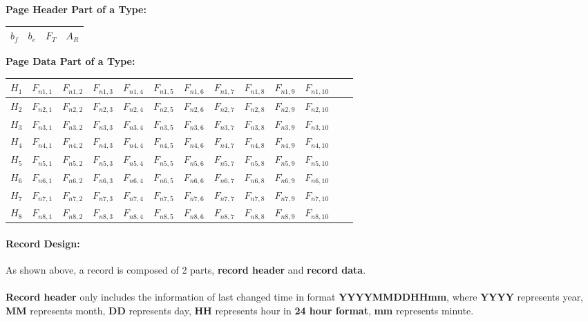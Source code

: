\documentclass[12pt]{report}
\begin{document}
\vspace{1cm}

\hspace{3.2cm}\textbf{Page Header Part of a Type:} 
{
\begin{center}
\begin{tabular}{|l|l|l|l|}
\hline
$b_f$ & $b_e$ & $F_{T}$ & $A_{R}$ \\
\hline
\end{tabular}
\end{center}
}

\vspace{2cm}

\hspace{3.4cm}\textbf{Page Data Part of a Type:} 
{
\begin{center}
\begin{tabular}{|l|l|l|l|l|l|l|l|l|l|l|l|l|}
\hline
 $H_{1}$ & $F_{n1,1}$ & $F_{n1,2}$ & $F_{n1,3}$ & $F_{n1,4}$ & $F_{n1,5}$ & $F_{n1,6}$ & $F_{n1,7}$ & $F_{n1,8}$ & $F_{n1,9}$ & $F_{n{1,10}}$ \\
\hline
 $H_{2}$ & $F_{n2,1}$ & $F_{n2,2}$ & $F_{n2,3}$ & $F_{n2,4}$ & $F_{n2,5}$ & $F_{n2,6}$ & $F_{n2,7}$ & $F_{n2,8}$ & $F_{n2,9}$ & $F_{n{2,10}}$ \\
\hline
 $H_{3}$ & $F_{n3,1}$ & $F_{n3,2}$ & $F_{n3,3}$ & $F_{n3,4}$ & $F_{n3,5}$ & $F_{n3,6}$ & $F_{n3,7}$ & $F_{n3,8}$ & $F_{n3,9}$ & $F_{n{3,10}}$ \\
\hline
 $H_{4}$ & $F_{n4,1}$ & $F_{n4,2}$ & $F_{n4,3}$ & $F_{n4,4}$ & $F_{n4,5}$ & $F_{n4,6}$ & $F_{n4,7}$ & $F_{n4,8}$ & $F_{n4,9}$ & $F_{n{4,10}}$ \\
\hline
 $H_{5}$ & $F_{n5,1}$ & $F_{n5,2}$ & $F_{n5,3}$ & $F_{n5,4}$ & $F_{n5,5}$ & $F_{n5,6}$ & $F_{n5,7}$ & $F_{n5,8}$ & $F_{n5,9}$ & $F_{n{5,10}}$ \\
\hline
 $H_{6}$ & $F_{n6,1}$ & $F_{n6,2}$ & $F_{n6,3}$ & $F_{n6,4}$ & $F_{n6,5}$ & $F_{n6,6}$ & $F_{n6,7}$ & $F_{n6,8}$ & $F_{n6,9}$ & $F_{n{6,10}}$ \\
\hline
 $H_{7}$ & $F_{n7,1}$ & $F_{n7,2}$ & $F_{n7,3}$ & $F_{n7,4}$ & $F_{n7,5}$ & $F_{n7,6}$ & $F_{n7,7}$ & $F_{n7,8}$ & $F_{n7,9}$ & $F_{n{7,10}}$ \\
\hline
 $H_{8}$ & $F_{n8,1}$ & $F_{n8,2}$ & $F_{n8,3}$ & $F_{n8,4}$ & $F_{n8,5}$ & $F_{n8,6}$ & $F_{n8,7}$ & $F_{n8,8}$ & $F_{n8,9}$ & $F_{n{8,10}}$ \\
\hline
\end{tabular}
\end{center}
}

\paragraph{Record Design:}
As shown above, a record is composed of 2 parts, \textbf{record header} and \textbf{record data}. \\\\
\textbf{Record header} only includes the information of last changed time in format {\large \textbf{YYYYMMDDHHmm}}, where \textbf{YYYY} represents year, \textbf{MM} represents month, \textbf{DD} represents day, \textbf{HH} represents hour in \textbf{24 hour format}, \textbf{mm} represents minute.
\end{document}
